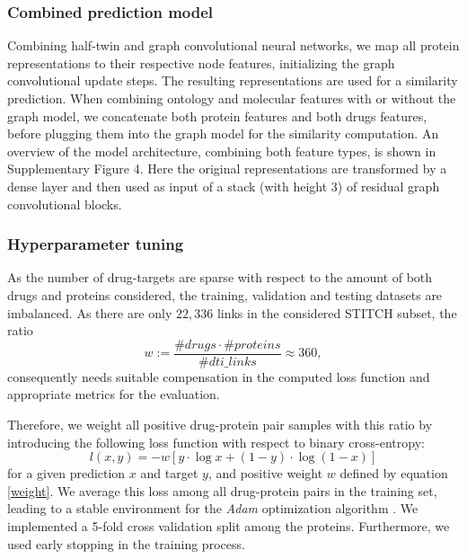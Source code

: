 \documentclass{bioinfo}
\begin{document}

\subsubsection{Combined prediction model}
Combining half-twin and graph convolutional neural networks, we map
all protein representations to their respective node features,
initializing the graph convolutional update steps. The resulting
representations are used for a similarity prediction.
When combining ontology and molecular features with or without the
graph model, we concatenate both protein features and both drugs
features, before plugging them into the graph model for the similarity
computation. An overview of the model architecture, combining both
feature types, is shown in Supplementary Figure
4. Here
the original representations are transformed by a dense layer and then
used as input of a stack (with height 3) of residual graph
convolutional blocks.

\subsubsection{Hyperparameter tuning}
As the number of drug-targets are sparse with respect to the amount of
both drugs and proteins considered, the training, validation and
testing datasets are imbalanced. As there are only $22,336$ links in
the considered STITCH subset, the ratio
\begin{equation}
	w:= \frac{\#drugs \cdot \#proteins}{\#dti\_links} \approx 360,
	\label{weight}
\end{equation}
consequently needs suitable compensation in the computed loss function and
appropriate metrics for the evaluation.

Therefore, we weight all positive drug-protein pair samples with this
ratio by introducing the following loss function with respect to 
binary cross-entropy:
\begin{equation}
	l(x,y) = - w \left[ y \cdot \log x + (1 - y) \cdot \log (1 - x) \right]
\end{equation}
for a given prediction $x$ and target $y$, and positive weight $w$
defined by equation \eqref{weight}. We average this loss among all
drug-protein pairs in the training set, leading to a stable
environment for the \textit{Adam} optimization algorithm
\citep{Adam2014}. We implemented a 5-fold cross validation split among
the proteins. Furthermore, we used early stopping in the training
process.
\end{document}
